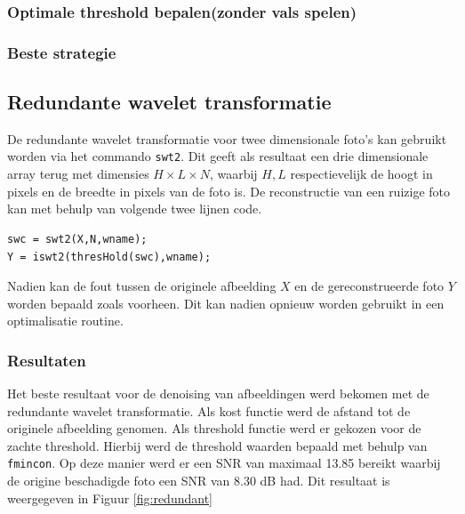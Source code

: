 \subsubsection{Optimale threshold bepalen(zonder vals spelen)}



\subsubsection{Beste strategie}




\subsection{Redundante wavelet transformatie}


De redundante wavelet transformatie voor twee dimensionale foto's kan gebruikt worden via het commando \verb|swt2|.
Dit geeft als resultaat een drie dimensionale array terug met dimensies $ H\times L \times N $, waarbij $ H, L $ respectievelijk de hoogt in pixels en de breedte in pixels van de foto is.
De reconstructie van een ruizige foto kan met behulp van volgende twee lijnen code.
\begin{verbatim}
swc = swt2(X,N,wname);
Y = iswt2(thresHold(swc),wname);
\end{verbatim}
Nadien kan de fout tussen de originele afbeelding $ X $ en de gereconstrueerde foto $ Y $ worden bepaald zoals voorheen.
Dit kan nadien opnieuw worden gebruikt in een optimalisatie routine.

\subsubsection{Resultaten}

Het beste resultaat voor de denoising van afbeeldingen werd bekomen met de redundante wavelet transformatie.
Als kost functie werd de afstand tot de originele afbeelding genomen.
Als threshold functie werd er gekozen voor de zachte threshold.
Hierbij werd de threshold waarden bepaald met behulp van \verb|fmincon|.
Op deze manier werd er een SNR van maximaal 13.85 bereikt waarbij de origine beschadigde foto een SNR van 8.30 dB had.
Dit resultaat is weergegeven in Figuur \ref{fig:redundant}



